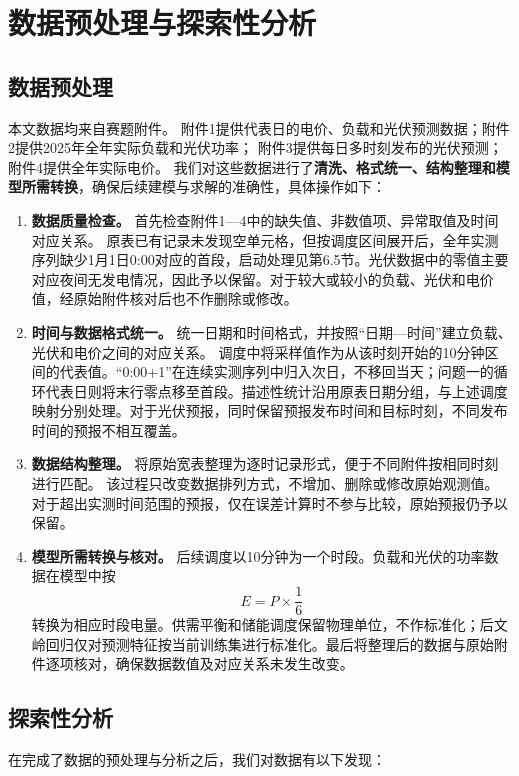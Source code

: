 \section{数据预处理与探索性分析}

\subsection{数据预处理}
本文数据均来自赛题附件。
附件1提供代表日的电价、负载和光伏预测数据；附件2提供2025年全年实际负载和光伏功率；
附件3提供每日多时刻发布的光伏预测；附件4提供全年实际电价。
我们对这些数据进行了\textbf{清洗、格式统一、结构整理和模型所需转换}，确保后续建模与求解的准确性，具体操作如下：

\begin{enumerate}
\item \textbf{数据质量检查。}
首先检查附件1—4中的缺失值、非数值项、异常取值及时间对应关系。
原表已有记录未发现空单元格，但按调度区间展开后，全年实测序列缺少1月1日0:00对应的首段，启动处理见第6.5节。光伏数据中的零值主要对应夜间无发电情况，因此予以保留。对于较大或较小的负载、光伏和电价值，经原始附件核对后也不作删除或修改。

\item \textbf{时间与数据格式统一。}
统一日期和时间格式，并按照“日期—时间”建立负载、光伏和电价之间的对应关系。
调度中将采样值作为从该时刻开始的10分钟区间的代表值。“0:00+1”在连续实测序列中归入次日，不移回当天；问题一的循环代表日则将末行零点移至首段。描述性统计沿用原表日期分组，与上述调度映射分别处理。对于光伏预报，同时保留预报发布时间和目标时刻，不同发布时间的预报不相互覆盖。

\item \textbf{数据结构整理。}
将原始宽表整理为逐时记录形式，便于不同附件按相同时刻进行匹配。
该过程只改变数据排列方式，不增加、删除或修改原始观测值。对于超出实测时间范围的预报，仅在误差计算时不参与比较，原始预报仍予以保留。

\item \textbf{模型所需转换与核对。}
后续调度以10分钟为一个时段。负载和光伏的功率数据在模型中按
\begin{equation}
E = P \times \frac{1}{6}
\end{equation}
转换为相应时段电量。供需平衡和储能调度保留物理单位，不作标准化；后文岭回归仅对预测特征按当前训练集进行标准化。最后将整理后的数据与原始附件逐项核对，确保数据数值及对应关系未发生改变。
\end{enumerate}


\subsection{探索性分析}
在完成了数据的预处理与分析之后，我们对数据有以下发现：

